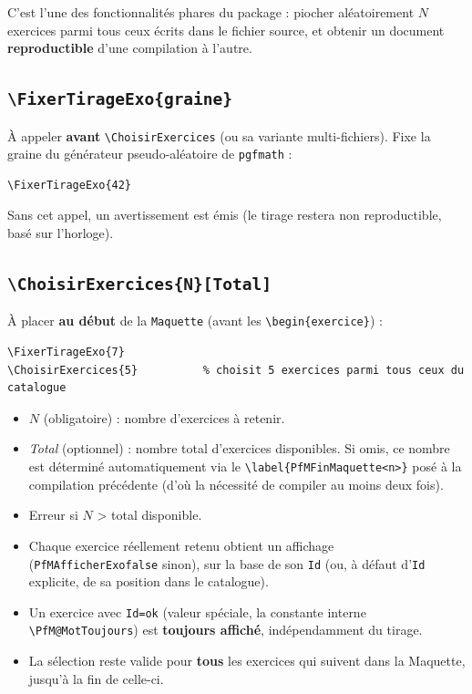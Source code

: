 \documentclass[11pt,a4paper]{article}
\newcommand{\pkg}[1]{\texttt{#1}}
\newcommand{\cmdname}[1]{\texttt{\textbackslash#1}}
\begin{document}
C'est l'une des fonctionnalités phares du package : piocher aléatoirement $N$ exercices parmi tous ceux écrits dans le fichier source, et obtenir un document \textbf{reproductible} d'une compilation à l'autre.

\subsection{\cmdname{FixerTirageExo\{graine\}}}

À appeler \textbf{avant} \cmdname{ChoisirExercices} (ou sa variante multi-fichiers). Fixe la graine du générateur pseudo-aléatoire de \pkg{pgfmath} :

\begin{lstlisting}
\FixerTirageExo{42}
\end{lstlisting}

Sans cet appel, un avertissement est émis (le tirage restera non reproductible, basé sur l'horloge).

\subsection{\cmdname{ChoisirExercices\{N\}[Total]}}

À placer \textbf{au début} de la \texttt{Maquette} (avant les \texttt{\textbackslash begin\{exercice\}}) :

\begin{lstlisting}
\FixerTirageExo{7}
\ChoisirExercices{5}          % choisit 5 exercices parmi tous ceux du catalogue
\end{lstlisting}

\begin{itemize}
  \item $N$ (obligatoire) : nombre d'exercices à retenir.
  \item \textit{Total} (optionnel) : nombre total d'exercices disponibles. Si omis, ce nombre est déterminé automatiquement via le \texttt{\textbackslash label\{PfMFinMaquette<n>\}} posé à la compilation précédente (d'où la nécessité de compiler au moins deux fois).
  \item Erreur si $N$ > total disponible.
  \item Chaque exercice réellement retenu obtient un affichage (\texttt{PfMAfficherExofalse} sinon), sur la base de son \texttt{Id} (ou, à défaut d'\texttt{Id} explicite, de sa position dans le catalogue).
  \item Un exercice avec \texttt{Id=ok} (valeur spéciale, la constante interne \texttt{\textbackslash PfM@MotToujours}) est \textbf{toujours affiché}, indépendamment du tirage.
  \item La sélection reste valide pour \textbf{tous} les exercices qui suivent dans la Maquette, jusqu'à la fin de celle-ci.
\end{itemize}
\end{document}
